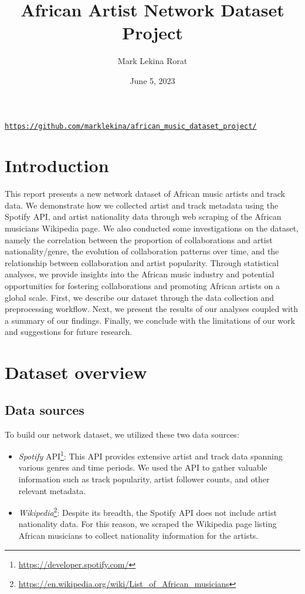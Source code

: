 \documentclass{article}
\title{African Artist Network Dataset Project}
\author{Mark Lekina Rorat}
\date{June 5, 2023}
\begin{document}
\maketitle

\begin{center}
    \texttt{\url{https://github.com/marklekina/african_music_dataset_project/}}
\end{center}

\doublespacing\section{Introduction}

This report presents a new network dataset of African music artists and track
data. We demonstrate how we collected artist and track metadata using the
Spotify API, and artist nationality data through web scraping of the African
musicians Wikipedia page. We also conducted some investigations on the dataset,
namely the correlation between the proportion of collaborations and artist
nationality/genre, the evolution of collaboration patterns over time, and the
relationship between collaboration and artist popularity. Through statistical
analyses, we provide insights into the African music industry and potential
opportunities for fostering collaborations and promoting African artists on a
global scale. First, we describe our dataset through the data collection and
preprocessing workflow. Next, we present the results of our analyses coupled
with a summary of our findings. Finally, we conclude with the limitations of
our work and suggestions for future research.

\section{Dataset overview}
\subsection{Data sources}

To build our network dataset, we utilized these two data sources:

\begin{itemize}
    \item \textit{Spotify} API\footnote{\url{https://developer.spotify.com/}}: This API provides extensive artist and track data spanning various genres and time periods. We used the API to gather valuable information such as track popularity, artist follower counts, and other relevant metadata.

    \item \textit{Wikipedia}\footnote{\url{https://en.wikipedia.org/wiki/List_of_African_musicians}}: Despite its breadth, the Spotify API does not include artist nationality data. For this reason, we scraped the Wikipedia page listing African musicians to collect nationality information for the artists.
\end{itemize}
\end{document}
